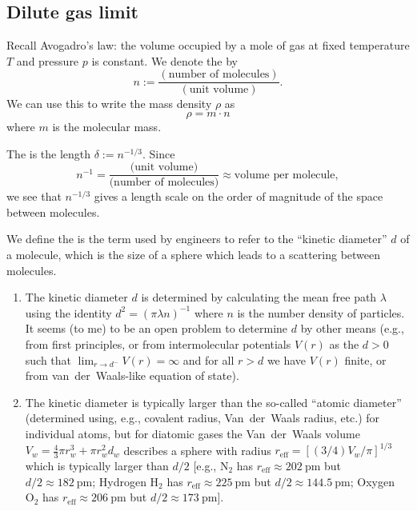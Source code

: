 \subsection*{Dilute gas limit}

\begin{node}
Recall Avogadro's law: the volume occupied by a mole of gas at fixed
temperature $T$ and pressure $p$ is constant. We denote the
 by
\begin{equation}
n:=\frac{(\mbox{number of molecules})}{(\mbox{unit volume})}.
\end{equation}
We can use this to write the mass density $\rho$ as
\begin{equation}
\rho = m\cdot n
\end{equation}
where $m$ is the molecular mass.
\end{node}

\begin{definition}
The  is the length $\delta := n^{-1/3}$.
Since
\begin{equation}
n^{-1}=\frac{\mbox{(unit volume)}}{\mbox{(number of molecules)}}\approx\mbox{volume per molecule},
\end{equation}
we see that $n^{-1/3}$ gives a length scale on the order of magnitude
of the space between molecules.
\end{definition}

\begin{definition}
We define the  is the term used by engineers to
refer to the ``kinetic diameter'' $d$ of a molecule, which is the size
of a sphere which leads to a scattering between molecules.
\end{definition}

\begin{aside}
\begin{enumerate}
\item 
The kinetic diameter $d$ is determined by calculating the mean free path
$\lambda$ using the identity
$d^{2}=(\pi\lambda n)^{-1}$ where $n$ is the number density of particles.
It seems (to me) to be an open problem to determine $d$ by other means
(e.g., from first principles, or from intermolecular potentials $V(r)$
as the $d>0$ such that $\lim_{r\to d^{-}}V(r)=\infty$ and for all
$r>d$ we have $V(r)$ finite, or from van~der~Waals-like equation of state).
\item The kinetic diameter is typically larger than the so-called
``atomic diameter'' (determined using, e.g., covalent radius,
Van~der~Waals radius, etc.) for individual atoms, but for diatomic
gases the Van~der~Waals volume $V_{w}=\frac{4}{3}\pi r_{w}^{3}+\pi r_{w}^{2}d_{w}$ describes a sphere with radius
$r_{\text{eff}}=[(3/4)V_{w}/\pi]^{1/3}$ which is typically larger than
$d/2$ [e.g.,
$\mathrm{N}_{2}$ has $r_{\text{eff}}\approx202~\mathrm{pm}$ but
$d/2\approx182~\mathrm{pm}$; Hydrogen $\mathrm{H}_{2}$ has $r_{\text{eff}}\approx225~\mathrm{pm}$
but $d/2\approx144.5~\mathrm{pm}$; Oxygen $\mathrm{O}_{2}$ has
$r_{\text{eff}}\approx206~\mathrm{pm}$ but $d/2\approx173~\mathrm{pm}$].
\end{enumerate}
\end{aside}

